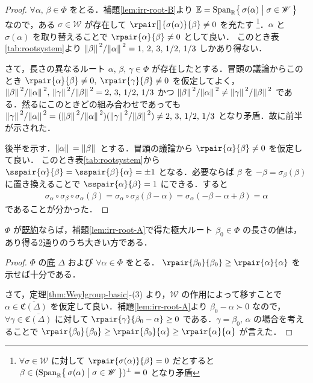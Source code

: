 \documentclass[rep_main]{subfiles}
\begin{document}
\begin{proof}
	$\forall \alpha,\, \beta \in \Phi$ をとる．補題\ref{lem:irr-root-B}より $\mathbb{E} = \operatorname{Span}_{\mathbb{R}} \bigl\{\, \sigma(\alpha) \bigm| \sigma \in \mathscr{W} \,\bigr\}$ なので，ある $\sigma \in \mathscr{W}$ が存在して $\rpair[\big]{\sigma(\alpha)}{\beta} \neq 0$ を充たす
	\footnote{$\forall \sigma \in \mathscr{W}$ に対して $\rpair{\sigma(\alpha)}{\beta} = 0$ だとすると $\beta \in (\operatorname{Span}_{\mathbb{R}} \bigl\{\, \sigma(\alpha) \bigm| \sigma \in \mathscr{W} \,\bigr\})^\perp = 0$ となり矛盾}．$\alpha$ と $\sigma(\alpha)$ を取り替えることで
	$\rpair{\alpha}{\beta} \neq 0$ として良い．
	このとき表\ref{tab:rootsystem}より $\norm*{\beta}^2 / \norm*{\alpha}^2 = 1,\, 2,\, 3,\, 1/2,\, 1/3$ しかあり得ない．

	さて，長さの異なるルート $\alpha,\, \beta,\, \gamma \in \Phi$ が存在したとする．冒頭の議論からこのとき $\rpair{\alpha}{\beta} \neq 0,\; \rpair{\gamma}{\beta} \neq 0$ を仮定してよく，$\norm*{\beta}^2 / \norm*{\alpha}^2,\, \norm*{\gamma}^2 / \norm*{\beta}^2 = 2,\, 3,\, 1/2,\, 1/3$ かつ $\norm*{\beta}^2 / \norm*{\alpha}^2 \neq \norm*{\gamma}^2 / \norm*{\beta}^2$ である．然るにこのときどの組み合わせであっても $\norm*{\gamma}^2 / \norm*{\alpha}^2 = (\norm*{\beta}^2 / \norm*{\alpha}^2) (\norm*{\gamma}^2 / \norm*{\beta}^2) \neq 2,\, 3,\, 1/2,\, 1/3$ となり矛盾．故に前半が示された．

	後半を示す．$\norm*{\alpha}	= \norm*{\beta}$ とする．冒頭の議論から $\rpair{\alpha}{\beta} \neq 0$ を仮定して良い．
	このとき表\ref{tab:rootsystem}から $\sspair{\alpha}{\beta} = \sspair{\beta}{\alpha} = \pm 1$ となる．必要ならば $\beta$ を $-\beta = \sigma_\beta(\beta)$ に置き換えることで $\sspair{\alpha}{\beta} = 1$ にできる．すると
	\begin{align}
		\sigma_\alpha \circ \sigma_\beta \circ \sigma_\alpha (\beta)
		= \sigma_\alpha \circ \sigma_\beta (\beta - \alpha) = \sigma_\alpha(- \beta - \alpha + \beta) = \alpha
	\end{align}
	であることが分かった．
\end{proof}


\begin{mylem}[label=lem:irr-root-D]{}
	$\Phi$ が\hyperref[def:irr-root]{既約}ならば，補題\ref{lem:irr-root-A}で得た極大ルート $\beta_0 \in \Phi$ の長さの値は，あり得る2通りのうち大きい方である．
\end{mylem}

\begin{proof}
	$\Phi$ の\hyperref[def:base-root]{底} $\Delta$ および $\forall \alpha \in \Phi$ をとる．
	$\rpair{\beta_0}{\beta_0} \ge \rpair{\alpha}{\alpha}$ を示せば十分である．

	さて，定理\ref{thm:Weylgroup-basic}-(3) より，$\mathscr{W}$ の作用によって移すことで $\alpha \in \overline{\mathfrak{C}(\Delta)}$ を仮定して良い．補題\ref{lem:irr-root-A}より $\beta_0 -\alpha \succ 0$ なので，$\forall \gamma \in \overline{\mathfrak{C}(\Delta)}$ に対して $\rpair{\gamma}{\beta_0 - \alpha} \ge 0$ である．$\gamma = \beta_0,\, \alpha$ の場合を考えることで $\rpair{\beta_0}{\beta_0} \ge \rpair{\beta_0}{\alpha} \ge \rpair{\alpha}{\alpha}$ が言えた．
\end{proof}
\end{document}
